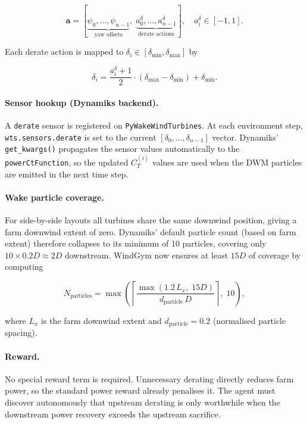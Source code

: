 \begin{equation}
    \mathbf{a} = [\underbrace{\psi_0,\ldots,\psi_{n-1}}_{\text{yaw offsets}},\;
                  \underbrace{a_0^\delta,\ldots,a_{n-1}^\delta}_{\text{derate actions}}],
    \quad a_i^\delta \in [-1,1].
\end{equation}

Each derate action is mapped to $\delta_i \in [\delta_\min, \delta_\max]$ by

\begin{equation}
    \delta_i = \frac{a_i^\delta + 1}{2} \cdot (\delta_\max - \delta_\min) + \delta_\min.
\end{equation}

\paragraph{Sensor hookup (Dynamiks backend).}
A \texttt{derate} sensor is registered on \texttt{PyWakeWindTurbines}.
At each environment step, \texttt{wts.sensors.derate} is set to the current
$[\delta_0,\ldots,\delta_{n-1}]$ vector.
Dynamiks' \texttt{get\_kwargs()} propagates the sensor values automatically to the
\texttt{powerCtFunction}, so the updated $C_T^{(i)}$ values are used when the DWM
particles are emitted in the next time step.

\paragraph{Wake particle coverage.}
For side-by-side layouts all turbines share the same downwind position, giving a
farm downwind extent of zero.
Dynamiks' default particle count (based on farm extent) therefore collapses to its
minimum of 10 particles, covering only $10 \times 0.2D \approx 2D$ downstream.
WindGym now ensures at least $15D$ of coverage by computing

\begin{equation}
    N_\text{particles} = \max\!\left(\left\lceil
        \frac{\max(1.2\,L_x,\;15D)}{d_\text{particle}\,D}
    \right\rceil,\; 10\right),
\end{equation}

where $L_x$ is the farm downwind extent and $d_\text{particle} = 0.2$ (normalised
particle spacing).

\paragraph{Reward.}
No special reward term is required.
Unnecessary derating directly reduces farm power, so the standard power reward
already penalises it.
The agent must discover autonomously that upstream derating is only worthwhile when
the downstream power recovery exceeds the upstream sacrifice.
